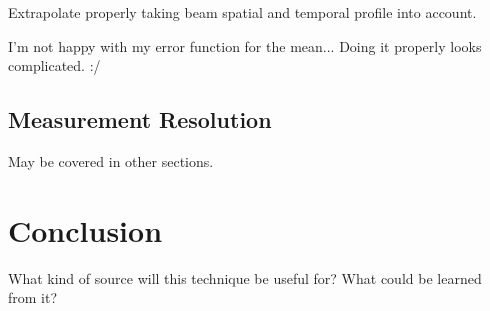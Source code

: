 {\color{red}Extrapolate properly taking beam spatial and temporal profile into account.}


{\color{red}I'm not happy with my error function for the mean... Doing it properly looks complicated. :/}


\subsection{Measurement Resolution}

May be covered in other sections.

\section{Conclusion}
What kind of source will this technique be useful for?
What could be learned from it?
